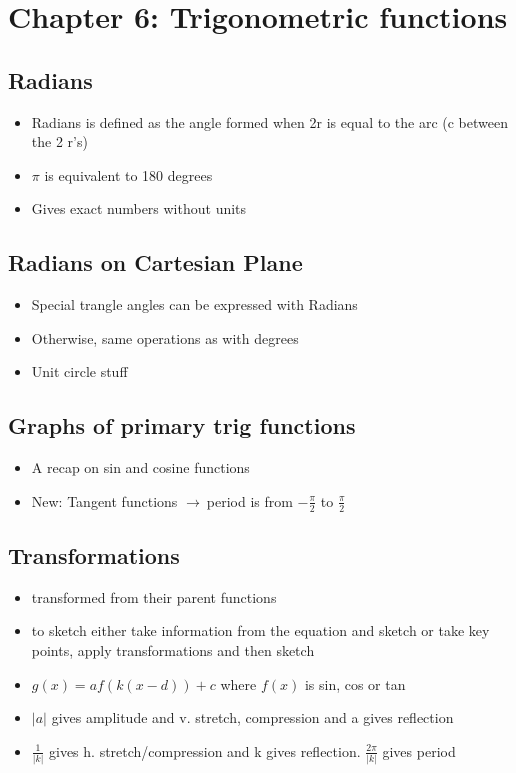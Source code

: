 \documentclass{article}
\newcommand{\rt}{$\to\ $}
\begin{document}
    \section{Chapter 6: Trigonometric functions}

    \subsection{Radians}
    \begin{itemize}
        \item Radians is defined as the angle formed when 2r is equal to the arc (c between the 2 r's)
        \item $\pi$ is equivalent to 180 degrees
        \item Gives exact numbers without units
    \end{itemize}

    \subsection{Radians on Cartesian Plane}
    \begin{itemize}
        \item Special trangle angles can be expressed with Radians
        \item Otherwise, same operations as with degrees
        \item Unit circle stuff
    \end{itemize}

    \subsection{Graphs of primary trig functions}
    \begin{itemize}
        \item A recap on sin and cosine functions
        \item New: Tangent functions \rt period is from $-\frac{\pi}{2}$ to $\frac{\pi}{2}$
    \end{itemize}

    \subsection{Transformations}
    \begin{itemize}
        \item transformed from their parent functions
        \item to sketch either take information from the equation and sketch or take key points, apply transformations and then sketch
        \item $g(x) = af(k(x-d)) + c$ where $f(x)$ is sin, cos or tan 
        \item $|a|$ gives amplitude and v. stretch, compression and a gives reflection
        \item $\frac{1}{|k|}$ gives h. stretch/compression and k gives reflection. $\frac{2\pi}{|k|}$ gives period
    \end{itemize}
\end{document}

